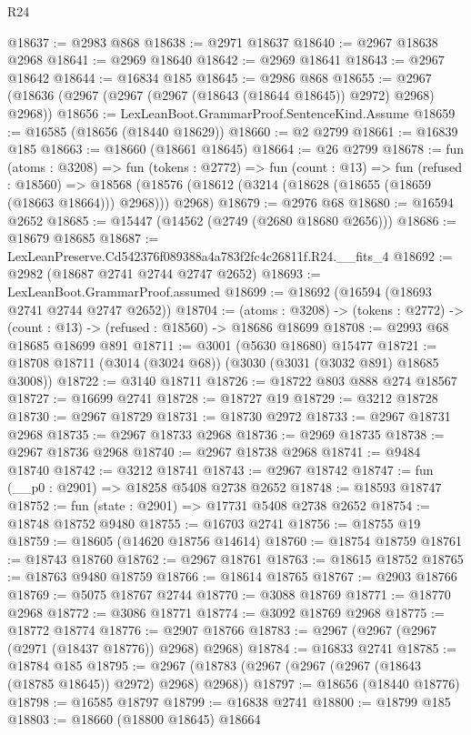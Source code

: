 \begin{lexlean}{R24}
\begin{coremodule}
@18637 := @2983 @868
@18638 := @2971 @18637
@18640 := @2967 @18638 @2968
@18641 := @2969 @18640
@18642 := @2969 @18641
@18643 := @2967 @18642
@18644 := @16834 @185
@18645 := @2986 @868
@18655 := @2967 (@18636 (@2967 (@2967 (@2967 (@18643 (@18644 @18645)) @2972) @2968) @2968))
@18656 := LexLeanBoot.GrammarProof.SentenceKind.Assume
@18659 := @16585 (@18656 (@18440 @18629))
@18660 := @2 @2799
@18661 := @16839 @185
@18663 := @18660 (@18661 @18645)
@18664 := @26 @2799
@18678 := fun (atoms : @3208) =>
  fun (tokens : @2772) =>
  fun (count : @13) =>
  fun (refused : @18560) =>
  @18568 (@18576 (@18612 (@3214 (@18628 (@18655 (@18659 (@18663 @18664))) @2968))) @2968)
@18679 := @2976 @68
@18680 := @16594 @2652
@18685 := @15447 (@14562 (@2749 (@2680 @18680 @2656)))
@18686 := @18679 @18685
@18687 := LexLeanPreserve.Cd542376f089388a4a783f2fc4c26811f.R24.__fits_4
@18692 := @2982 (@18687 @2741 @2744 @2747 @2652)
@18693 := LexLeanBoot.GrammarProof.assumed
@18699 := @18692 (@16594 (@18693 @2741 @2744 @2747 @2652))
@18704 := (atoms : @3208) ->
  (tokens : @2772) -> (count : @13) -> (refused : @18560) -> @18686 @18699
@18708 := @2993 @68 @18685 @18699 @891
@18711 := @3001 (@5630 @18680) @15477
@18721 := @18708 @18711 (@3014 (@3024 @68)) (@3030 (@3031 (@3032 @891) @18685 @3008))
@18722 := @3140 @18711
@18726 := @18722 @803 @888 @274 @18567
@18727 := @16699 @2741
@18728 := @18727 @19
@18729 := @3212 @18728
@18730 := @2967 @18729
@18731 := @18730 @2972
@18733 := @2967 @18731 @2968
@18735 := @2967 @18733 @2968
@18736 := @2969 @18735
@18738 := @2967 @18736 @2968
@18740 := @2967 @18738 @2968
@18741 := @9484 @18740
@18742 := @3212 @18741
@18743 := @2967 @18742
@18747 := fun (__p0 : @2901) => @18258 @5408 @2738 @2652
@18748 := @18593 @18747
@18752 := fun (state : @2901) => @17731 @5408 @2738 @2652
@18754 := @18748 @18752 @9480
@18755 := @16703 @2741
@18756 := @18755 @19
@18759 := @18605 (@14620 @18756 @14614)
@18760 := @18754 @18759
@18761 := @18743 @18760
@18762 := @2967 @18761
@18763 := @18615 @18752
@18765 := @18763 @9480 @18759
@18766 := @18614 @18765
@18767 := @2903 @18766
@18769 := @5075 @18767 @2744
@18770 := @3088 @18769
@18771 := @18770 @2968
@18772 := @3086 @18771
@18774 := @3092 @18769 @2968
@18775 := @18772 @18774
@18776 := @2907 @18766
@18783 := @2967 (@2967 (@2967 (@2971 (@18437 @18776)) @2968) @2968)
@18784 := @16833 @2741
@18785 := @18784 @185
@18795 := @2967 (@18783 (@2967 (@2967 (@2967 (@18643 (@18785 @18645)) @2972) @2968) @2968))
@18797 := @18656 (@18440 @18776)
@18798 := @16585 @18797
@18799 := @16838 @2741
@18800 := @18799 @185
@18803 := @18660 (@18800 @18645) @18664

\end{coremodule}
\end{lexlean}
